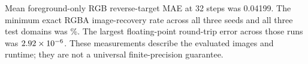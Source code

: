 Mean foreground-only RGB reverse-target MAE at 32 steps was 0.04199. The minimum exact RGBA image-recovery rate across all three seeds and all three test domains was \ExactRate\%. The largest floating-point round-trip error across those runs was $2.92\times10^{-6}$. These measurements describe the evaluated images and runtime; they are not a universal finite-precision guarantee.
